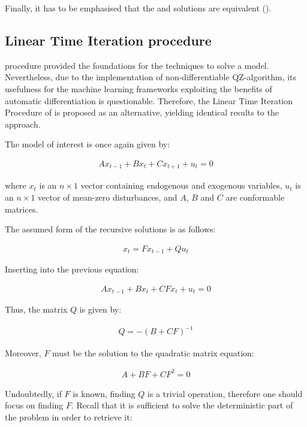 \documentclass{pracamgr}
\numberwithin{equation}{section}
\begin{document}
Finally, it has to be emphasised that the \citet{uhlig1998toolkit} and \citet{klein2000using} solutions are equivalent (\citet{bonaldi2010identification}).

\subsection{Linear Time Iteration procedure}

\citet{uhlig1998toolkit} procedure provided the foundations for the techniques to solve a  \citet{smets2003estimated} model. Nevertheless, due to the implementation of non-differentiable QZ-algorithm, its usefulness for the machine learning frameworks exploiting the benefits of automatic differentiation is questionable. Therefore, the Linear Time Iteration Procedure of \cite{rendahl2017linear} is proposed as an alternative, yielding identical results to the \citet{uhlig1998toolkit} approach.

The model of interest is once again given by:

\begin{align}
Ax_{t-1} + Bx_{t} + Cx_{t+1} + u_{t} = 0
\end{align}

where $x_{t}$ is an $n \times 1$ vector containing endogenous and exogenous variables, $u_{t}$ is an $n \times 1$ vector of mean-zero disturbances, and $A$, $B$ and $C$ are conformable matrices.

The assumed form of the recursive solutions is as follows:

\begin{align}
x_{t} = Fx_{t-1} + Qu_{t}
\end{align}

Inserting into the previous equation:

\begin{align}
Ax_{t-1} + Bx_{t} + CFx_{t} + u_{t} = 0
\end{align}

Thus, the matrix $Q$ is given by:

\begin{align}
Q = -\left( B + CF \right)^{-1}
\end{align}

Moreover, $F$ must be the solution to the quadratic matrix equation:

\begin{align}
A + BF + CF^{2} = 0
\end{align}

Undoubtedly, if $F$ is known, finding $Q$ is a trivial operation, therefore one should focus on finding $F$. Recall that it is sufficient to solve the deterministic part of the problem in order to retrieve it:
\end{document}
